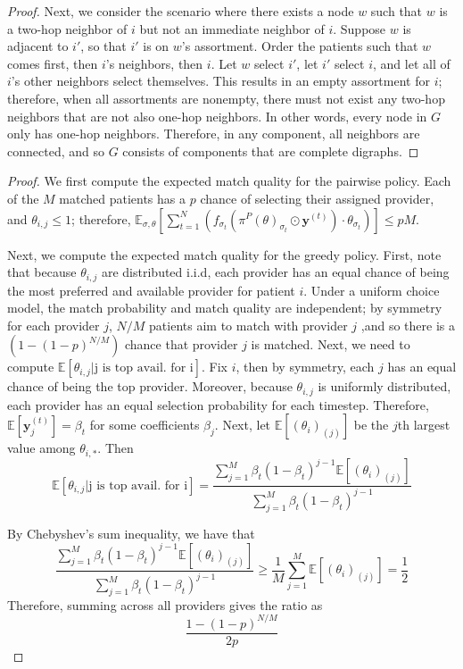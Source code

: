 \begin{proof}
Next, we consider the scenario where there exists a node $w$ such that $w$ is a two-hop neighbor of $i$ but not an immediate neighbor of $i$. 
Suppose $w$ is adjacent to $i'$, so that $i'$ is on $w$'s assortment. 
Order the patients such that $w$ comes first, then $i$'s neighbors, then $i$. 
Let $w$ select $i'$, let $i'$ select $i$, and let all of $i$'s other neighbors select themselves.
This results in an empty assortment for $i$; therefore, when all assortments are nonempty, there must not exist any two-hop neighbors that are not also one-hop neighbors. 
In other words, every node in $G$ only has one-hop neighbors.  
Therefore, in any component, all neighbors are connected, and so $G$ consists of components that are complete digraphs. 
\end{proof}


\thmgrouping* 
\begin{proof}
    We first compute the expected match quality for the pairwise policy. 
    Each of the $M$ matched patients has a $p$ chance of selecting their assigned provider, and $\theta_{i,j} \leq 1$; therefore, $\mathbb{E}_{\sigma,\theta}[\sum_{t=1}^{N}  (f_{\sigma_{t}}\left(\pi^{P}(\theta)_{\sigma_{t}} \odot \mathbf{y}^{(t)}\right) \cdot \theta_{\sigma_{t}})] \leq pM$.

    Next, we compute the expected match quality for the greedy policy. 
    First, note that because $\theta_{i,j}$ are distributed i.i.d, each provider has an equal chance of being the most preferred and available  provider for patient $i$. 
    Under a uniform choice model, the match probability and match quality are independent; by symmetry for each provider $j$, $N/M$ patients aim to match with provider $j$ ,and so there is a $(1-(1-p)^{N/M})$ chance that provider $j$ is matched. 
    Next, we need to compute $\mathbb{E}[\theta_{i,j} | \text{j is top avail. for i}]$. 
    Fix $i$, then by symmetry, each $j$ has an equal chance of being the top provider. 
    Moreover, because $\theta_{i,j}$ is uniformly distributed, each provider has an equal selection probability for each timestep. 
    Therefore, $\mathbb{E}[\mathbf{y}^{(t)}_{j}] = \beta_{t}$ for some coefficients $\beta_{j}$. 
    Next, let $\mathbb{E}[(\theta_{i})_{(j)}]$ be the $j$th largest value among $\theta_{i,*}$. 
    Then
    \begin{equation}
        \mathbb{E}[\theta_{i,j} | \text{j is top avail. for i}] = \frac{\sum_{j=1}^{M} \beta_{t}(1-\beta_{t})^{j-1} \mathbb{E}[(\theta_{i})_{(j)}]}{\sum_{j=1}^{M} \beta_{t}(1-\beta_{t})^{j-1}}
    \end{equation}

    By Chebyshev's sum inequality, we have that 
    \begin{equation}
        \frac{\sum_{j=1}^{M} \beta_{t}(1-\beta_{t})^{j-1} \mathbb{E}[(\theta_{i})_{(j)}]}{\sum_{j=1}^{M} \beta_{t}(1-\beta_{t})^{j-1}} \geq \frac{1}{M} \sum_{j=1}^{M} \mathbb{E}[(\theta_{i})_{(j)}] = \frac{1}{2}
    \end{equation}
    Therefore, summing across all providers gives the ratio as 
    \begin{equation}
        \frac{1-(1-p)^{N/M}}{2p}
    \end{equation}
\end{proof}

